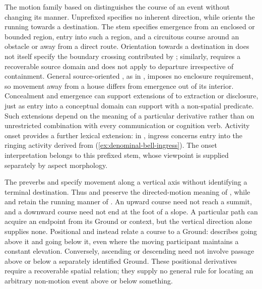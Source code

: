 The motion family based on   distinguishes the course
of an event without changing its manner. Unprefixed  specifies
no inherent direction, while  orients the running towards a
destination. The stem  specifies emergence from an enclosed or
bounded region,  entry into such a region, and  a
circuitous course around an obstacle or away from a direct route. Orientation
towards a destination in  does not itself specify the boundary
crossing contributed by ; similarly,  requires a
recoverable source domain and does not apply to departure irrespective of
containment. General source-oriented , as in 
, imposes no enclosure requirement, so movement
away from a house differs from emergence out of its interior. Concealment and
emergence can support extensions of 
to extraction or disclosure, just as entry into a conceptual domain can support
 with a non-spatial predicate. Such extensions depend on the meaning
of a particular derivative rather than on unrestricted combination with every
communication or cognition verb.
Activity onset provides a further lexical extension: in
 , ingress concerns entry into the
ringing activity derived from  
(\ref{ex:denominal-bell-ingress}). The onset interpretation belongs to this
prefixed stem, whose viewpoint is supplied separately by aspect morphology.

The preverbs  and  specify movement along a vertical
axis without identifying a terminal destination. Thus  and
 preserve the directed-motion meaning of , while
 and  retain the running manner of .
An upward course need not reach a summit, and a downward course need not end
at the foot of a slope. A particular path can acquire an endpoint from its
Ground or context, but the vertical direction alone supplies none.
Positional  and  instead relate a course to a Ground:
 describes going above it and  going below it,
even where the moving participant maintains a constant elevation. Conversely,
ascending or descending need not involve passage above or below a separately
identified Ground. These positional derivatives require a recoverable
spatial relation; they supply no general rule for locating an arbitrary
non-motion event above or below something.

